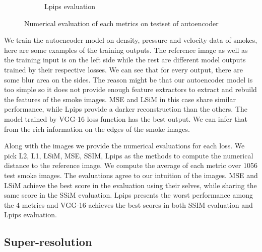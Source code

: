 \documentclass[a4paper,12pt,twoside]{report}
\begin{document}
\begin{figure}
\begin{subfigure}{0.32\textwidth}
		\caption{Lpips evaluation}
	\end{subfigure}
	\caption{Numerical evaluation of each metrics on testset of autoencoder}
\end{figure}
We train the autoencoder model on density, pressure and velocity data of smokes, here are some examples of the training outputs. The reference image as well as the training input is on the left side  while the rest are different model outputs trained by their respective losses. We can see that for every output, there are some blur area on the sides. The reason might be that our autoencoder model is too simple so it does not provide enough feature extractors to extract and rebuild the features of the smoke images. MSE and LSiM in this case share similar performance, while Lpips provide a darker reconstruction than the others. The model trained by VGG-16 loss function has the best output. We can infer that from the rich information on the edges of the smoke images.

 Along with the images we provide the numerical evaluations for each loss. We pick L2, L1, LSiM, MSE, SSIM, Lpips as the methods to compute the numerical distance to the reference image. We compute the average of each metric over 1056 test smoke images. The evaluations agree to our intuition of the images. MSE and LSiM achieve the best score in the evaluation using their selves, while sharing the same score in the SSiM evaluation. Lpips presents the worst performance among the 4 metrics and VGG-16 achieves the best scores in both SSIM evaluation and Lpips evaluation.  
\subsection{Super-resolution}
\end{document}
